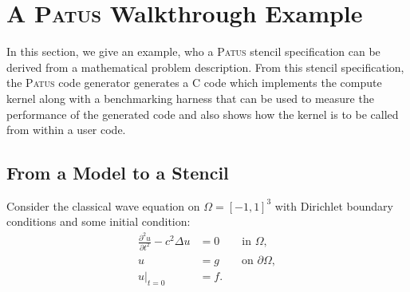 \chapter{A \textsc{Patus} Walkthrough Example}
\label{sec:walkthrough}

In this section, we give an example, who a \textsc{Patus} stencil specification
can be derived from a mathematical problem description.
From this stencil specification, the \textsc{Patus} code generator generates a
C code which implements the compute kernel along with a benchmarking harness that
can be used to measure the performance of the generated code and also shows how
the kernel is to be called from within a user code.


\section{From a Model to a Stencil}

Consider the classical wave equation on $\Omega=[-1,1]^3$ with Dirichlet boundary conditions and some initial condition:
\begin{align}
  \frac{\partial^2 u}{\partial t^2} - c^2 \Delta u & = 0 \qquad \text{in }\Omega, \nonumber \\
  u & = g \qquad \text{on }\partial\Omega, \\
  u|_{t=0} & = f. \nonumber
  \label{eq:wave}
\end{align}

